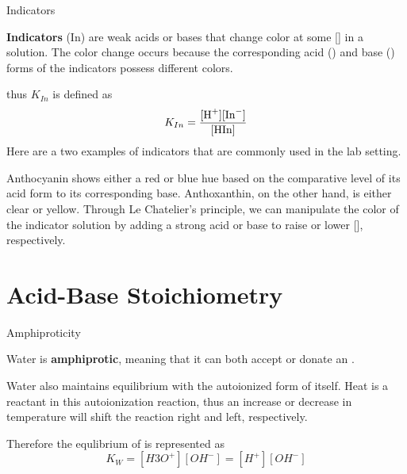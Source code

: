 \documentclass[10pt]{article}
\begin{document}
  \begin{definition}[label=def:indicator]{Indicators}

    \textbf{Indicators} (In) are weak acids or bases that change color at some [] in a solution. The color change occurs because the corresponding acid () and base () forms of the indicators possess different colors.
  
  
    thus $K_{In}$ is defined as 
    \[
      K_{In} = \frac{[\ce{H+}][\ce{In-}]}{[\ce{HIn}]}
    \] 
    Here are a two examples of indicators that are commonly used in the lab setting.



    Anthocyanin shows either a red or blue hue based on the comparative level of its acid form to its corresponding base. Anthoxanthin, on the other hand, is either clear or yellow. Through Le Chatelier's principle, we can manipulate the color of the indicator solution by adding a strong acid or base to raise or lower [], respectively. 

  \end{definition}
  
\section{Acid-Base Stoichiometry}

  \begin{definition}{Amphiproticity}
 
    Water is \textbf{amphiprotic}, meaning that it can both accept or donate an .



    Water also maintains equilibrium with the autoionized form of itself. Heat is a reactant in this autoionization reaction, thus an increase or decrease in temperature will shift the reaction right and left, respectively.


    Therefore the equlibrium of  is represented as
    \[
      K_{W} = [H3O^{+}][OH^{-}] = [H^{+}][OH^{-}]
    \]

  \end{definition}
\end{document}
